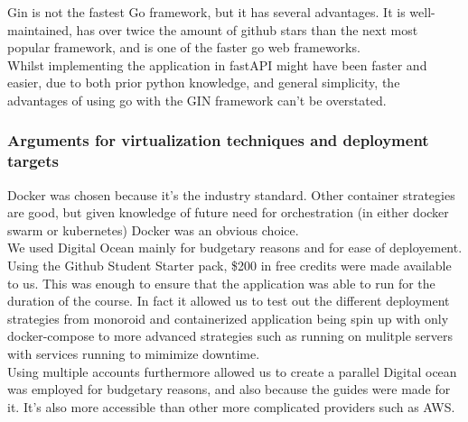 Gin is not the fastest Go framework, but it has several advantages. It is well-maintained, has over twice the 
amount of github stars than the next most popular framework, and is one of the faster go web frameworks.\\

Whilst implementing the application in fastAPI might have been faster and easier, due to both prior python 
knowledge, and general simplicity, the advantages of using go with the GIN framework can't be overstated. 

\subsubsection{Arguments for virtualization techniques and deployment targets}
Docker was chosen because it's the industry standard. Other container strategies are good, but given knowledge 
of future need for orchestration (in either docker swarm or kubernetes) Docker was an obvious choice.\\

We used Digital Ocean mainly for budgetary reasons and for ease of deployement. Using the Github Student 
Starter pack, \$200 in free credits were made available to us. This was enough to ensure that the application 
was able to run for the duration of the course. In fact it allowed us to test out the different deployment strategies
from monoroid and containerized application being spin up with only docker-compose to more advanced strategies such as
running on mulitple servers with services running to mimimize downtime.\\

Using multiple accounts furthermore allowed us to create a parallel Digital ocean was employed for budgetary reasons, and also because the guides were made for it.
It's also more accessible than other more complicated providers such as AWS. 

